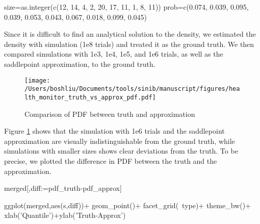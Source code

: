 \begin{example}
size=as.integer(c(12, 14, 4, 2, 20, 17, 11, 1, 8, 11))
prob=c(0.074, 0.039, 0.095, 0.039, 0.053, 0.043, 0.067, 0.018, 0.099, 0.045)
\end{example}

Since it is difficult to find an analytical solution to the density, we estimated the density with simulation (1e8 trials) and treated it as the ground truth. We then compared simulations with 1e3, 1e4, 1e5, and 1e6 trials, as well as the saddlepoint approximation, to the ground truth. 


\begin{figure}[h]
\texttt{[image: /Users/boshliu/Documents/tools/sinib/manuscript/figures/health\_monitor\_truth\_vs\_approx\_pdf.pdf]}
\caption{Comparison of PDF between truth and approximation}
\label{fig:5}
\end{figure}

Figure \ref{fig:5} shows that the simulation with 1e6 trials and the saddlepoint approximation are visually indistinguishable from the ground truth, while simulations with smaller sizes shows clear deviations from the truth. To be precise, we plotted the difference in PDF between the truth and the approximation.

\begin{example}
merged[,diff:=pdf_truth-pdf_approx]

ggplot(merged,aes(s,diff))+
	geom_point()+
	facet_grid(~type)+
	theme_bw()+
	xlab('Quantile')+ylab('Truth-Approx')
\end{example}

